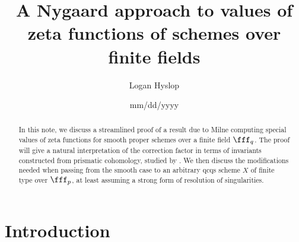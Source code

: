 \newcommand{\Samp}{50}

\title{
	A Nygaard approach to values of zeta functions of schemes over finite fields
}

\author{ Logan Hyslop }








\date{mm/dd/yyyy}




	\DeclareDocumentCommand{}
	\DeclareDocumentCommand{}
	\DeclareDocumentCommand{}
	\DeclareDocumentCommand{}
	
	
	
	\maketitle
	

	

	

	



	

	

	\begin{abstract}
In this note, we discuss a streamlined proof of a result due to Milne \cite{MilneValues} computing special values of zeta functions for smooth proper schemes over a finite field $\fff_q$.  The proof will give a natural interpretation of the correction factor in terms of invariants constructed from prismatic cohomology, studied by \cite{morin2021topological}.  We then discuss the modifications needed when passing from the smooth case to an arbitrary qcqs scheme $X$ of finite type over $\fff_p$, at least assuming a strong form of resolution of singularities.
	\end{abstract}
{\small
	\setcounter{tocdepth}{1}
	\tableofcontents
	\vspace{3.0ex}
}
	\section{Introduction}
		\setcounter{section}{1}
		
